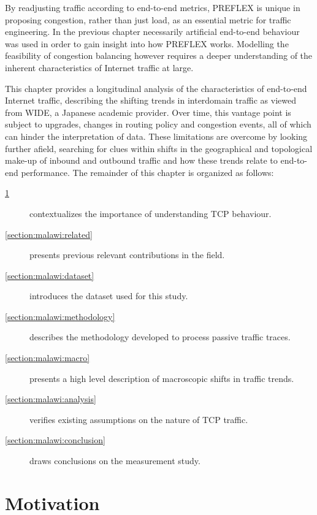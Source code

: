By readjusting traffic according to end-to-end metrics, \ac{PREFLEX} is unique in proposing congestion, rather than just load, as an essential metric for traffic engineering.
In the previous chapter necessarily artificial end-to-end behaviour was used in order to gain insight into how \ac{PREFLEX} works.
Modelling the feasibility of congestion balancing however requires a deeper understanding of the inherent characteristics of Internet traffic at large.

This chapter provides a longitudinal analysis of the characteristics of end-to-end Internet traffic, describing the shifting trends in interdomain traffic as viewed from \acs{WIDE}, a Japanese academic provider.
Over time, this vantage point is subject to upgrades, changes in routing policy and congestion events, all of which can hinder the interpretation of data.
These limitations are overcome by looking further afield, searching for clues within shifts in the geographical and topological make-up of inbound and outbound traffic and how these trends relate to end-to-end performance.
The remainder of this chapter is organized as follows:

\renewcommand{\descriptionlabel}[1]{\hspace{\labelsep}\textbf{Section #1}}
\begin{description}
\item[\ref{section:malawi:motivation}] contextualizes the importance of understanding \ac{TCP} behaviour.
\item[\ref{section:malawi:related}] presents previous relevant contributions in the field.
\item[\ref{section:malawi:dataset}] introduces the dataset used for this study.
\item[\ref{section:malawi:methodology}] describes the methodology developed to process passive traffic traces.
\item[\ref{section:malawi:macro}] presents a high level description of macroscopic shifts in traffic trends.
\item[\ref{section:malawi:analysis}] verifies existing assumptions on the nature of \ac{TCP} traffic.
\item[\ref{section:malawi:conclusion}] draws conclusions on the measurement study.
\end{description}




\section{Motivation}
\label{section:malawi:motivation}

